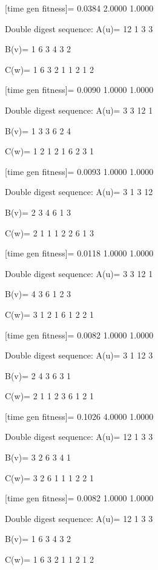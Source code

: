 [time gen fitness]=
    0.0384    2.0000    1.0000

Double digest sequence:
A(u)=
    12     1     3     3

B(v)=
     1     6     3     4     3     2

C(w)=
     1     6     3     2     1     1     2     1     2

[time gen fitness]=
    0.0090    1.0000    1.0000

Double digest sequence:
A(u)=
     3     3    12     1

B(v)=
     1     3     3     6     2     4

C(w)=
     1     2     1     2     1     6     2     3     1

[time gen fitness]=
    0.0093    1.0000    1.0000

Double digest sequence:
A(u)=
     3     1     3    12

B(v)=
     2     3     4     6     1     3

C(w)=
     2     1     1     1     2     2     6     1     3

[time gen fitness]=
    0.0118    1.0000    1.0000

Double digest sequence:
A(u)=
     3     3    12     1

B(v)=
     4     3     6     1     2     3

C(w)=
     3     1     2     1     6     1     2     2     1

[time gen fitness]=
    0.0082    1.0000    1.0000

Double digest sequence:
A(u)=
     3     1    12     3

B(v)=
     2     4     3     6     3     1

C(w)=
     2     1     1     2     3     6     1     2     1

[time gen fitness]=
    0.1026    4.0000    1.0000

Double digest sequence:
A(u)=
    12     1     3     3

B(v)=
     3     2     6     3     4     1

C(w)=
     3     2     6     1     1     1     2     2     1

[time gen fitness]=
    0.0082    1.0000    1.0000

Double digest sequence:
A(u)=
    12     1     3     3

B(v)=
     1     6     3     4     3     2

C(w)=
     1     6     3     2     1     1     2     1     2

